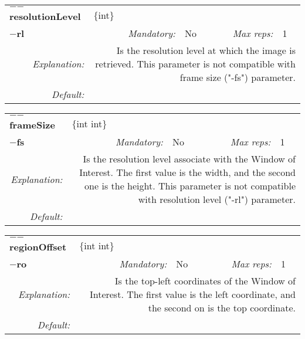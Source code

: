 \begin{center}\begin{tabular}{|rr|rl|rl|}
\hline
\multicolumn{2}{|l|}{\textbf{$-$$-$resolutionLevel}} & \multicolumn{4}{|l|}{$\{$int$\}$} \\
\cline{3-6}
\multicolumn{2}{|l|}{\textbf{$-$rl}} & \emph{Mandatory:} & No & \emph{Max reps:} & 1 \\
\hline
\emph{Explanation:} & \multicolumn{5}{|p{12cm}|}{Is the resolution level at which the image is retrieved. This parameter is not compatible with frame size ("-fs") parameter.} \\
\hline
\emph{Default:} & \multicolumn{5}{|p{12cm}|}{} \\
\hline
\end{tabular}\end{center}
\begin{center}\begin{tabular}{|rr|rl|rl|}
\hline
\multicolumn{2}{|l|}{\textbf{$-$$-$frameSize}} & \multicolumn{4}{|l|}{$\{$int int$\}$} \\
\cline{3-6}
\multicolumn{2}{|l|}{\textbf{$-$fs}} & \emph{Mandatory:} & No & \emph{Max reps:} & 1 \\
\hline
\emph{Explanation:} & \multicolumn{5}{|p{12cm}|}{Is the resolution level associate with the Window of Interest. The first value is the width, and the second one is the height. This parameter is not compatible with resolution level ("-rl") parameter.} \\
\hline
\emph{Default:} & \multicolumn{5}{|p{12cm}|}{} \\
\hline
\end{tabular}\end{center}
\begin{center}\begin{tabular}{|rr|rl|rl|}
\hline
\multicolumn{2}{|l|}{\textbf{$-$$-$regionOffset}} & \multicolumn{4}{|l|}{$\{$int int$\}$} \\
\cline{3-6}
\multicolumn{2}{|l|}{\textbf{$-$ro}} & \emph{Mandatory:} & No & \emph{Max reps:} & 1 \\
\hline
\emph{Explanation:} & \multicolumn{5}{|p{12cm}|}{Is the top-left coordinates of the Window of Interest. The first value is the left coordinate, and the second on is the top coordinate.} \\
\hline
\emph{Default:} & \multicolumn{5}{|p{12cm}|}{} \\
\hline
\end{tabular}\end{center}
